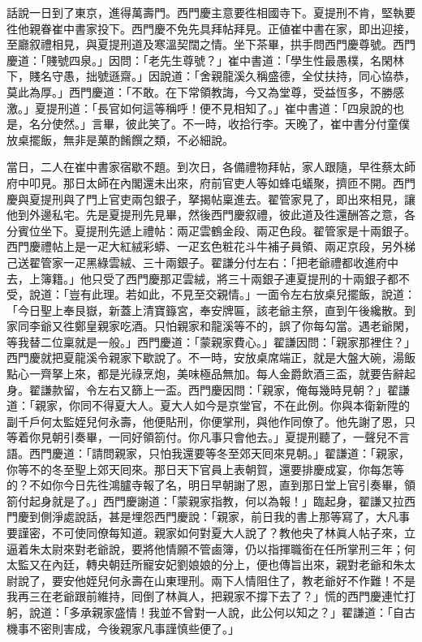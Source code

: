 話說一日到了東京，進得萬壽門。西門慶主意要徃相國寺下。夏提刑不肯，堅執要徃他親眷崔中書家投下。西門慶不免先具拜帖拜見。正値崔中書在家，即出迎接，至廳叙禮相見，與夏提刑道及寒溫契闊之情。坐下茶畢，拱手問西門慶尊號。西門慶道：「賤號四泉。」因問：「老先生尊號？」崔中書道：「學生性最愚樸，名閑林下，賤名守愚，拙號遜齋。」因說道：「舍親龍溪久稱盛德，全仗扶持，同心協恭，莫此為厚。」西門慶道：「不敢。在下常領教誨，今又為堂尊，受益恆多，不勝感激。」夏提刑道：「長官如何這等稱呼！便不見相知了。」崔中書道：「四泉說的也是，名分使然。」言畢，彼此笑了。不一時，收拾行李。天晚了，崔中書分付童僕放桌擺飯，無非是菓酌餚饌之類，不必細說。

當日，二人在崔中書家宿歇不題。到次日，各備禮物拜帖，家人跟隨，早徃蔡太師府中叩見。那日太師在內閣還未出來，府前官吏人等如蜂屯蟻聚，擠匝不開。西門慶與夏提刑與了門上官吏兩包銀子，拏揭帖稟進去。翟管家見了，即出來相見，讓他到外邊私宅。先是夏提刑先見畢，然後西門慶叙禮，彼此道及徃還酬答之意，各分賓位坐下。夏提刑先遞上禮帖：兩疋雲鶴金段、兩疋色段。翟管家是十兩銀子。西門慶禮帖上是一疋大紅絨彩蟒、一疋玄色粧花斗牛補子員領、兩疋京段，另外梯己送翟管家一疋黑綠雲絨、三十兩銀子。{}翟謙分付左右：「把老爺禮都收進府中去，上簿籍。」他只受了西門慶那疋雲絨，將三十兩銀子連夏提刑的十兩銀子都不受，說道：「豈有此理。若如此，不見至交親情。」一面令左右放桌兒擺飯，說道：「今日聖上奉艮嶽，新蓋上清寶籙宮，奉安牌匾，該老爺主祭，直到午後纔散。到家同李爺又徃鄭皇親家吃酒。只怕親家和龍溪等不的，誤了你每勾當。遇老爺閑，等我替二位稟就是一般。」西門慶道：「蒙親家費心。」翟謙因問：「親家那裡住？」西門慶就把夏龍溪令親家下歇說了。不一時，安放桌席端正，就是大盤大碗，湯飯點心一齊拏上來，都是光祿烹炮，美味極品無加。每人金爵飲酒三盃，就要告辭起身。翟謙款留，令左右又篩上一盃。西門慶因問：「親家，俺每幾時見朝？」翟謙道：「親家，你同不得夏大人。夏大人如今是京堂官，不在此例。你與本衛新陞的副千戶何太監姪兒何永壽，他便貼刑，你便掌刑，與他作同僚了。他先謝了恩，只等着你見朝引奏畢，一同好領箚付。你凡事只會他去。」夏提刑聽了，一聲兒不言語。西門慶道：「請問親家，只怕我還要等冬至郊天囘來見朝。」翟謙道：「親家，你等不的冬至聖上郊天囘來。那日天下官員上表朝賀，還要排慶成宴，你每怎等的？不如你今日先徃鴻臚寺報了名，明日早朝謝了恩，直到那日堂上官引奏畢，領箚付起身就是了。」西門慶謝道：「蒙親家指教，何以為報！」臨起身，翟謙又拉西門慶到側淨處說話，{}甚是埋怨西門慶說：「親家，前日我的書上那等寫了，大凡事要謹密，不可使同僚每知道。親家如何對夏大人說了？{}教他央了林眞人帖子來，立逼着朱太尉來對老爺說，{}要將他情願不管鹵簿，仍以指揮職銜在任所掌刑三年；何太監又在內廷，轉央朝廷所寵安妃劉娘娘的分上，便也傳旨出來，親對老爺和朱太尉說了，要安他姪兒何永壽在山東理刑。兩下人情阻住了，教老爺好不作難！不是我再三在老爺跟前維持，囘倒了林眞人，把親家不撐下去了？」慌的西門慶連忙打躬，說道：「多承親家盛情！我並不曾對一人說，此公何以知之？」翟謙道：「自古機事不密則害成，今後親家凡事謹慎些便了。」

